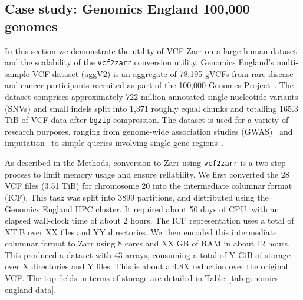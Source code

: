 \documentclass[a4paper,num-refs]{oup-contemporary}
\begin{document}
\subsection{Case study: Genomics England 100,000 genomes}
In this section we demonstrate the utility of VCF Zarr on a large human dataset
and the scalability of the \texttt{vcf2zarr} conversion utility.
Genomics England’s multi-sample VCF dataset (aggV2) is an 
aggregate of 78,195 gVCFs from rare disease and cancer participants 
recruited as part of the 100,000 Genomes Project~\cite{turnbull2018100}. 
The dataset comprises approximately 722 million annotated single-nucleotide 
variants (SNVs) and small indels split into 1,371 roughly equal chunks and 
totalling 165.3 TiB of VCF data after \texttt{bgzip} compression. 
The dataset is used for a variety of research purposes, ranging from 
genome-wide association studies (GWAS)~\cite{kousathanas2022whole} and 
imputation~\cite{shi2023genomics} to 
simple queries involving single gene 
regions~\cite{leggatt2023genotype,lam2023repeat}.

As described in the Methods, conversion to Zarr using 
\texttt{vcf2zarr} is a two-step 
process to limit memory usage and ensure reliability. We 
first converted the 28 VCF files (3.51 TiB) for chromosome 20
into the intermediate columnar format (ICF). This task was 
split into 3899 partitions, and distributed using the Genomics England
HPC cluster. It required about 50 days of CPU, with an elapsed
wall-clock time of about 2 hours. The ICF representation uses a total
of XTiB over XX files and YY directories. We then encoded this intermediate
columnar format to Zarr using 8 cores and XX GB of RAM in about 12 hours.
This produced a dataset with 43 arrays, consuming a 
total of Y GiB of storage over X directories and 
Y files. This is about a 4.8X reduction over the original VCF. 
The top fields in terms 
of storage are detailed in Table~\ref{tab-genomics-england-data}.
\end{document}

